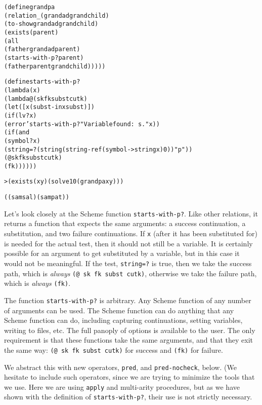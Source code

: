 \begin{alltt}
(define grandpa
  (relation _ (grandad grandchild)
    (to-show grandad grandchild)
    (exists (parent)
      (all 
        (father grandad parent)
        (starts-with-p? parent)
        (father parent grandchild)))))
\end{alltt}

\begin{alltt}
(define starts-with-p?
  (lambda (x)
    (lambda@ (sk fk subst cutk)
      (let ([x (subst-in x subst)])
        (if (lv? x)
          (error 'starts-with-p? "Variable found: ~s." x))
        (if (and
              (symbol? x)
              (string=? (string (string-ref (symbol->string x) 0)) "p"))
          (@ sk fk subst cutk)
          (fk))))))
\end{alltt}

\begin{alltt}
> (exists (x y) (solve 10 (grandpa x y)))

((sam sal) (sam pat))
\end{alltt}

Let's look closely at the Scheme function \texttt{starts-with-p?}.
Like other relations, it returns a function that expects the same
arguments: a success continuation, a substitution, and two failure
continuations.  If \texttt{x} (after it has been substituted for) is
needed for the actual test, then it should not still be a variable.
It is certainly possible for an argument to get substituted by a
variable, but in this case it would not be meaningful. If the test,
\texttt{string=?} is true, then we take the success path, which is
\emph{always} \texttt{(@ sk fk subst cutk)}, otherwise we take the
failure path, which is \emph{always} \texttt{(fk)}.

The function \texttt{starts-with-p?} is arbitrary.  Any Scheme
function of any number of arguments can be used.  The Scheme function
can do anything that any Scheme function can do, including capturing
continuations, setting variables, writing to files, etc.  The full
panoply of options is available to the user.  The only requirement is
that these functions take the same arguments, and that they exit the
same way: \texttt{(@ sk fk subst cutk)} for success
and \texttt{(fk)} for failure.

We abstract this with new operators, \texttt{pred}, and
\texttt{pred-nocheck}, below. (We hesitate to include such operators,
since we are trying to minimize the tools that we use.  Here we are
using \texttt{apply} and multi-arity procedures, but as we have shown
with the definition of \texttt{starts-with-p?}, their use is not
strictly necessary.

